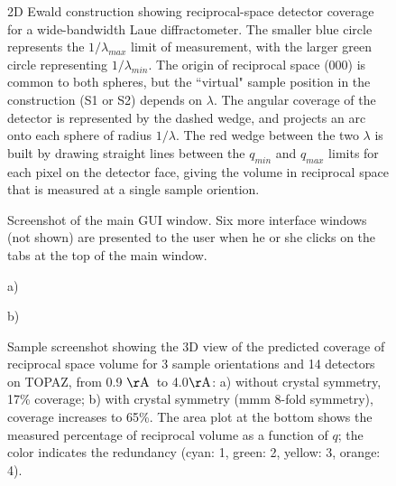 \documentclass[final]{iucr}              %
\newif\ifdograph
\newcommand{\ang}{$\mathrm{\AA} $}
\begin{document}






\begin{figure}
\caption{2D Ewald construction showing reciprocal-space detector coverage
for a wide-bandwidth Laue diffractometer. The smaller blue circle represents the
$1/\lambda_{max}$ limit of measurement, with the larger green circle
representing $1/\lambda_{min}$. The origin of reciprocal space (000) is common to both
spheres, but the ``virtual" sample position in the construction (S1 or S2)
depends on $\lambda$. The angular coverage of the detector is represented by the dashed
wedge, and projects an arc onto each sphere of radius $1/\lambda$. The
red wedge between the two $\lambda$ is built by drawing straight lines between
the $q_{min}$ and $q_{max}$ limits for each pixel on the detector face, giving the
volume in reciprocal space that is measured at a single sample oriention. }

\ifdograph
  \texttt{[image: ewald\_fig.ps]}
\fi
     
\label{fig:ewald_fig} 
\end{figure} 
 
  
\begin{figure}
\caption{Screenshot of the main GUI window. Six more interface windows (not
shown) are presented to the user when he or she clicks on the tabs at the
top of the main window.}
\ifdograph
  \texttt{[image: main\_gui]}
\fi
\label{fig:screenshots}
\end{figure}
 



\begin{figure}
\caption{Sample screenshot showing the 3D view of the predicted coverage of
reciprocal space volume for 3 sample orientations and 14 detectors on TOPAZ,
from 0.9 \ang\ to 4.0\ang: a) without crystal symmetry, 17\% coverage; b) with crystal symmetry (mmm 8-fold
symmetry), coverage increases to 65\%. The area plot at the bottom shows the
measured percentage of reciprocal volume as a function of $q$; the
color indicates the redundancy (cyan: 1, green: 2, yellow: 3, orange: 4). }
\ifdograph
  \texttt{[image: volume\_nosym]} 
\fi
a)
\ifdograph
  \texttt{[image: volume\_sym]}
\fi
b)
\label{fig:volume_view} 
\end{figure}
\end{document}

